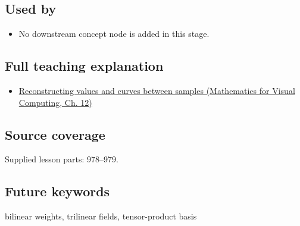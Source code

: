 \subsection{Used by}\label{appendix-0a09b6dfdc86-used-by}

\begin{itemize}
\tightlist
\item
  No downstream concept node is added in this stage.
\end{itemize}

\subsection{Full teaching explanation}\label{appendix-0a09b6dfdc86-full-teaching-explanation}

\begin{itemize}
\tightlist
\item
  \href{../02-Mathematics-for-Visual-Computing/main.pdf\#nameddest=02-foundations-ii-ch028-reconstructing-values-and-curves-between-samples}{Reconstructing values and curves between samples (Mathematics for Visual Computing, Ch. 12)}
\end{itemize}

\subsection{Source coverage}\label{appendix-0a09b6dfdc86-source-coverage}

Supplied lesson parts: 978--979.

\subsection{Future keywords}\label{appendix-0a09b6dfdc86-future-keywords}

bilinear weights, trilinear fields, tensor-product basis
